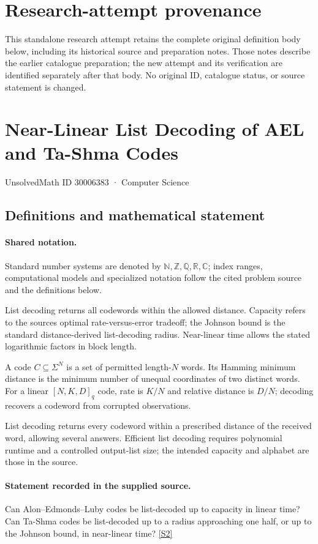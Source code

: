 \documentclass[11pt]{article}
\begin{document}
\section*{Research-attempt provenance}
This standalone research attempt retains the complete original definition body below,
including its historical source and preparation notes. Those notes describe the
earlier catalogue preparation; the new attempt and its verification are identified
separately after that body. No original ID, catalogue status, or source statement is changed.

\section{Near-Linear List Decoding of AEL and Ta-Shma Codes}\label{30006383}
{\small UnsolvedMath ID 30006383 · Computer Science}
\subsection{Definitions and mathematical statement}

\paragraph{Shared notation.}Standard number systems are denoted by $\mathbb N,\mathbb Z,\mathbb Q,\mathbb R,\mathbb C$; index ranges, computational models and specialized notation follow the cited problem source and the definitions below.


List decoding returns all codewords within the allowed distance. Capacity refers to the source\textquotesingle s optimal rate-versus-error tradeoff; the Johnson bound is the standard distance-derived list-decoding radius. Near-linear time allows the stated logarithmic factors in block length.

A code $C\subseteq\Sigma^N$ is a set of permitted length-$N$ words. Its Hamming minimum distance is the minimum number of unequal coordinates of two distinct words. For a linear $[N,K,D]_q$ code, rate is $K/N$ and relative distance is $D/N$; decoding recovers a codeword from corrupted observations.

List decoding returns every codeword within a prescribed distance of the received word, allowing several answers. Efficient list decoding requires polynomial runtime and a controlled output-list size; the intended capacity and alphabet are those in the source.
\paragraph{Statement recorded in the supplied source.}
Can Alon–Edmonds–Luby codes be list-decoded up to capacity in linear time? Can Ta-Shma codes be list-decoded up to a radius approaching one half, or up to the Johnson bound, in near-linear time? \href{https://doi.org/10.4171/owr/2025/41}{[S2]}
\end{document}
